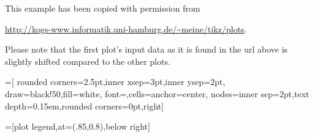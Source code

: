 %
\begingroup
This example has been copied with permission from 

\noindent
\url{http://kogs-www.informatik.uni-hamburg.de/~meine/tikz/plots}.

Please note that the first plot's input data as it is found in the url above is slightly shifted compared to the other plots.

=[
   rounded corners=2.5pt,inner xsep=3pt,inner ysep=2pt,
   draw=black!50,fill=white,
   font=\footnotesize,cells={anchor=center},
   nodes={inner sep=2pt,text depth=0.15em,rounded corners=0pt,right}]

=[plot legend,at={(.85,0.8)},below right]

